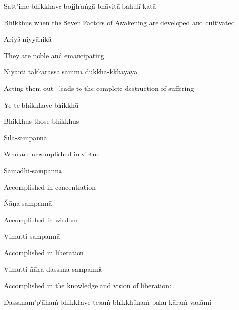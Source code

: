 Satt'ime bhikkhave bojjh'aṅgā bhāvitā bahulī-katā

\begin{english-hang}
  Bhikkhus when the Seven Factors of Awakening are developed and cultivated
\end{english-hang}

Ariyā niyyānikā

\begin{english}
  They are noble and emancipating
\end{english}

Nīyanti takkarassa sammā dukkha-kkhayāya

\begin{english}
  Acting them out \breathmark\ leads to the complete destruction of suffering
\end{english}

\suttaRef{[SN 46.19]}

Ye te bhikkhave bhikkhū

\begin{english}
  Bhikkhus those bhikkhus
\end{english}

Sīla-sampannā

\begin{english}
  Who are accomplished in virtue
\end{english}

Samādhi-sampannā

\begin{english}
  Accomplished in concentration
\end{english}

Ñāṇa-sampannā

\begin{english}
  Accomplished in wisdom
\end{english}

Vimutti-sampannā

\begin{english}
  Accomplished in liberation
\end{english}

Vimutti-ñāṇa-dassana-sampannā

\begin{english}
  Accomplished in the knowledge and vision of liberation:
\end{english}

\begin{pali-hang}
  Dassanam'p'āhaṁ bhikkhave tesaṁ bhikkhūnaṁ bahu-kāraṁ vadāmi
\end{pali-hang}

